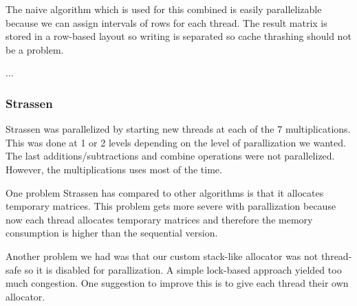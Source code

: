 The naive algorithm which is used for this combined is easily parallelizable because we can assign intervals of rows for each thread. The result matrix is stored in a row-based layout so writing is separated so cache thrashing should not be a problem.

...



\subsubsection{Strassen}

Strassen was parallelized by starting new threads at each of the 7 multiplications. This was done at 1 or 2 levels depending on the level of parallization we wanted. The last additions/subtractions and combine operations were not parallelized. However, the multiplications uses most of the time.

One problem Strassen has compared to other algorithms is that it allocates temporary matrices. This problem gets more severe with parallization because now each thread allocates temporary matrices and therefore the memory consumption is higher than the sequential version.

Another problem we had was that our custom stack-like allocator was not thread-safe so it is disabled for parallization. A simple lock-based approach yielded too much congestion. One suggestion to improve this is to give each thread their own allocator.

